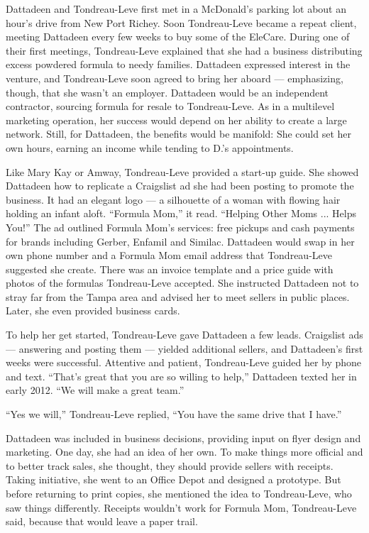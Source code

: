 Dattadeen and Tondreau-Leve first met in a McDonald's parking lot about
an hour's drive from New Port Richey. Soon Tondreau-Leve became a repeat
client, meeting Dattadeen every few weeks to buy some of the EleCare.
During one of their first meetings, Tondreau-Leve explained that she had
a business distributing excess powdered formula to needy families.
Dattadeen expressed interest in the venture, and Tondreau-Leve soon
agreed to bring her aboard --- emphasizing, though, that she wasn't an
employer. Dattadeen would be an independent contractor, sourcing formula
for resale to Tondreau-Leve. As in a multilevel marketing operation, her
success would depend on her ability to create a large network. Still,
for Dattadeen, the benefits would be manifold: She could set her own
hours, earning an income while tending to D.'s appointments.

Like Mary Kay or Amway, Tondreau-Leve provided a start-up guide. She
showed Dattadeen how to replicate a Craigslist ad she had been posting
to promote the business. It had an elegant logo --- a silhouette of a
woman with flowing hair holding an infant aloft. ``Formula Mom,'' it
read. ``Helping Other Moms ... Helps You!'' The ad outlined Formula
Mom's services: free pickups and cash payments for brands including
Gerber, Enfamil and Similac. Dattadeen would swap in her own phone
number and a Formula Mom email address that Tondreau-Leve suggested she
create. There was an invoice template and a price guide with photos of
the formulas Tondreau-Leve accepted. She instructed Dattadeen not to
stray far from the Tampa area and advised her to meet sellers in public
places. Later, she even provided business cards.

To help her get started, Tondreau-Leve gave Dattadeen a few leads.
Craigslist ads --- answering and posting them --- yielded additional
sellers, and Dattadeen's first weeks were successful. Attentive and
patient, Tondreau-Leve guided her by phone and text. ``That's great that
you are so willing to help,'' Dattadeen texted her in early 2012. ``We
will make a great team.''

``Yes we will,'' Tondreau-Leve replied, ``You have the same drive that I
have.''

Dattadeen was included in business decisions, providing input on flyer
design and marketing. One day, she had an idea of her own. To make
things more official and to better track sales, she thought, they should
provide sellers with receipts. Taking initiative, she went to an Office
Depot and designed a prototype. But before returning to print copies,
she mentioned the idea to Tondreau-Leve, who saw things differently.
Receipts wouldn't work for Formula Mom, Tondreau-Leve said, because that
would leave a paper trail.

